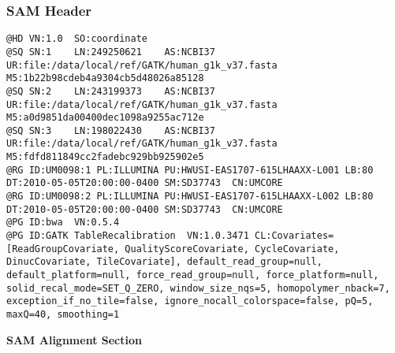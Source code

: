 \documentclass{beamer}
\newcommand{\centeredtitle}[1]{
\begin{center}
    \Huge{\bf{#1}}
\end{center}
}
\newcommand{\hugeslide}[1]{
\begin{frame}
\centeredtitle{#1}
\end{frame}
}
\begin{document}
\begin{frame}[fragile]
\frametitle{SAM Header}
\begin{framed}\tiny
\begin{verbatim}
@HD	VN:1.0	SO:coordinate
@SQ	SN:1	LN:249250621	AS:NCBI37	UR:file:/data/local/ref/GATK/human_g1k_v37.fasta	M5:1b22b98cdeb4a9304cb5d48026a85128
@SQ	SN:2	LN:243199373	AS:NCBI37	UR:file:/data/local/ref/GATK/human_g1k_v37.fasta	M5:a0d9851da00400dec1098a9255ac712e
@SQ	SN:3	LN:198022430	AS:NCBI37	UR:file:/data/local/ref/GATK/human_g1k_v37.fasta	M5:fdfd811849cc2fadebc929bb925902e5
@RG	ID:UM0098:1	PL:ILLUMINA	PU:HWUSI-EAS1707-615LHAAXX-L001	LB:80	DT:2010-05-05T20:00:00-0400	SM:SD37743	CN:UMCORE
@RG	ID:UM0098:2	PL:ILLUMINA	PU:HWUSI-EAS1707-615LHAAXX-L002	LB:80	DT:2010-05-05T20:00:00-0400	SM:SD37743	CN:UMCORE
@PG	ID:bwa	VN:0.5.4
@PG	ID:GATK TableRecalibration	VN:1.0.3471	CL:Covariates=[ReadGroupCovariate, QualityScoreCovariate, CycleCovariate, DinucCovariate, TileCovariate], default_read_group=null, default_platform=null, force_read_group=null, force_platform=null, solid_recal_mode=SET_Q_ZERO, window_size_nqs=5, homopolymer_nback=7, exception_if_no_tile=false, ignore_nocall_colorspace=false, pQ=5, maxQ=40, smoothing=1
\end{verbatim}
\end{framed}
\end{frame}


\hugeslide{SAM Alignment Section}
\end{document}
